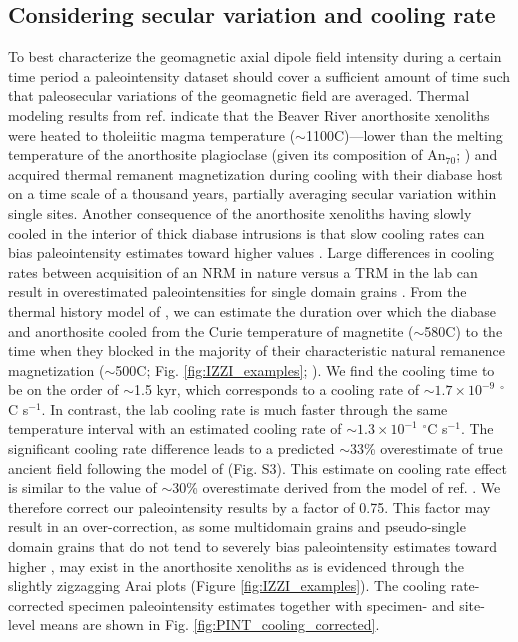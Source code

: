 \documentclass[9pt,twocolumn,twoside,lineno]{pnas-new}
\begin{document}
\subsection*{Considering secular variation and cooling rate}
To best characterize the geomagnetic axial dipole field intensity during a certain time period a paleointensity dataset should cover a sufficient amount of time such that paleosecular variations of the geomagnetic field are averaged. Thermal modeling results from ref. \citealp{Zhang2021b} indicate that the Beaver River anorthosite xenoliths were heated to tholeiitic magma temperature ($\sim$1100\textdegree C)---lower than the melting temperature of the anorthosite plagioclase (given its composition of An$_{70}$; \citealp{Morrison1983a, Doyle2016a}) and acquired thermal remanent magnetization during cooling with their diabase host on a time scale of a thousand years, partially averaging secular variation within single sites. Another consequence of the anorthosite xenoliths having slowly cooled in the interior of thick diabase intrusions is that slow cooling rates can bias paleointensity estimates toward higher values \cite{Halgedahl1980a}. Large differences in cooling rates between acquisition of an NRM in nature versus a TRM in the lab can result in overestimated paleointensities for single domain grains \cite{Dodson1980a, Halgedahl1980a, Nagy2021a}. From the thermal history model of \cite{Zhang2021b}, we can estimate the duration over which the diabase and anorthosite cooled from the Curie temperature of magnetite ($\sim$580\textdegree C) to the time when they blocked in the majority of their characteristic natural remanence magnetization ($\sim$500\textdegree  C; Fig. \ref{fig:IZZI_examples}; \citealp{Zhang2021b}). We find the cooling time to be on the order of $\sim$1.5 kyr, which corresponds to a cooling rate of $\sim1.7\times10^{-9}$ $^\circ$C s$^{-1}$. In contrast, the lab cooling rate is much faster through the same temperature interval with an estimated cooling rate of $\sim1.3\times10^{-1}$ $^\circ$C s$^{-1}$. The significant cooling rate difference leads to a predicted $\sim$33\% overestimate of true ancient field following the model of \citealp{Halgedahl1980a} (Fig. S3). This estimate on cooling rate effect is similar to the value of $\sim$30\% overestimate derived from the model of ref. \citealp{Nagy2021a}. We therefore correct our paleointensity results by a factor of 0.75. This factor may result in an over-correction, as some multidomain grains and pseudo-single domain grains that do not tend to severely bias paleointensity estimates toward higher \cite{Biggin2013a}, may exist in the anorthosite xenoliths as is evidenced through the slightly zigzagging Arai plots (Figure \ref{fig:IZZI_examples}). The cooling rate-corrected specimen paleointensity estimates together with specimen- and site-level means are shown in Fig. \ref{fig:PINT_cooling_corrected}.
\end{document}
